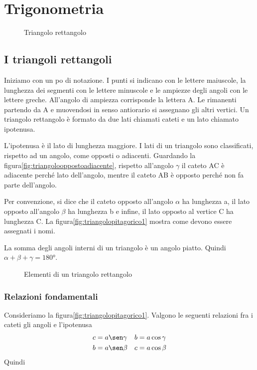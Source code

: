\chapter{Trigonometria}
\label{cha:trigonometria}
\minitoc
\mtcskip                                %
\minilof                                %
\mtcskip                                %
\minilot
\begin{figure}
	\centering
	
	\caption{Triangolo rettangolo}
	\label{fig:triangolopitagorico1}
\end{figure}
\section{I triangoli rettangoli}
Iniziamo con un po di notazione. I punti si indicano con le lettere maiuscole, la lunghezza dei segmenti con le lettere minuscole e le ampiezze degli angoli con le lettere greche. All'angolo di ampiezza corrisponde la lettera A. Le rimanenti partendo da A e muovendosi in senso antiorario si assegnano gli altri vertici. Un triangolo rettangolo è formato da due lati chiamati cateti e un lato chiamato ipotenusa.

 L'ipotenusa è il lato di lunghezza maggiore. I lati di un triangolo sono classificati, rispetto ad un angolo, come opposti o adiacenti. Guardando la figura\nobs\vref{fig:triangolooppostoadiacente}, rispetto all'angolo $\gamma$ il cateto AC è adiacente perché lato dell'angolo, mentre il cateto AB è opposto perché non fa parte dell'angolo. 
 
 Per convenzione, si dice che il cateto opposto all'angolo $\alpha$ ha lunghezza a, il lato opposto all'angolo $\beta$ ha lunghezza b e infine, il lato opposto al vertice C ha lunghezza C. La figura\nobs\vref{fig:triangolopitagorico1} mostra come devono essere assegnati i nomi.
 
 La somma degli angoli interni di un triangolo è un angolo piatto. Quindi $\alpha+\beta+\gamma=\ang{180}$. 
\begin{figure}
	\centering
	
	\caption{Elementi di un triangolo rettangolo}
	\label{fig:triangolooppostoadiacente}
\end{figure}
\subsection{Relazioni fondamentali}
Consideriamo la figura\nobs\vref{fig:triangolopitagorico1}. Valgono le seguenti relazioni fra i cateti gli angoli e l'ipotenusa
\begin{align*}
c&=a\sen\gamma&b&=a\cos\gamma\\
b&=a\sen\beta&c&=a\cos\beta
\end{align*}
Quindi

